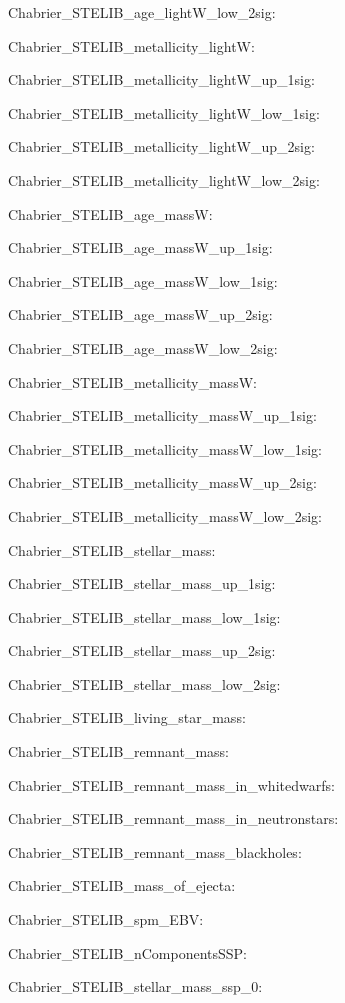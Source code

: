 \item Chabrier\_STELIB\_age\_lightW\_low\_2sig: 
\item Chabrier\_STELIB\_metallicity\_lightW: 
\item Chabrier\_STELIB\_metallicity\_lightW\_up\_1sig: 
\item Chabrier\_STELIB\_metallicity\_lightW\_low\_1sig: 
\item Chabrier\_STELIB\_metallicity\_lightW\_up\_2sig: 
\item Chabrier\_STELIB\_metallicity\_lightW\_low\_2sig: 
\item Chabrier\_STELIB\_age\_massW: 
\item Chabrier\_STELIB\_age\_massW\_up\_1sig: 
\item Chabrier\_STELIB\_age\_massW\_low\_1sig: 
\item Chabrier\_STELIB\_age\_massW\_up\_2sig: 
\item Chabrier\_STELIB\_age\_massW\_low\_2sig: 
\item Chabrier\_STELIB\_metallicity\_massW: 
\item Chabrier\_STELIB\_metallicity\_massW\_up\_1sig: 
\item Chabrier\_STELIB\_metallicity\_massW\_low\_1sig: 
\item Chabrier\_STELIB\_metallicity\_massW\_up\_2sig: 
\item Chabrier\_STELIB\_metallicity\_massW\_low\_2sig: 
\item Chabrier\_STELIB\_stellar\_mass: 
\item Chabrier\_STELIB\_stellar\_mass\_up\_1sig: 
\item Chabrier\_STELIB\_stellar\_mass\_low\_1sig: 
\item Chabrier\_STELIB\_stellar\_mass\_up\_2sig: 
\item Chabrier\_STELIB\_stellar\_mass\_low\_2sig: 
\item Chabrier\_STELIB\_living\_star\_mass: 
\item Chabrier\_STELIB\_remnant\_mass: 
\item Chabrier\_STELIB\_remnant\_mass\_in\_whitedwarfs: 
\item Chabrier\_STELIB\_remnant\_mass\_in\_neutronstars: 
\item Chabrier\_STELIB\_remnant\_mass\_blackholes: 
\item Chabrier\_STELIB\_mass\_of\_ejecta: 
\item Chabrier\_STELIB\_spm\_EBV: 
\item Chabrier\_STELIB\_nComponentsSSP: 
\item Chabrier\_STELIB\_stellar\_mass\_ssp\_0: 
